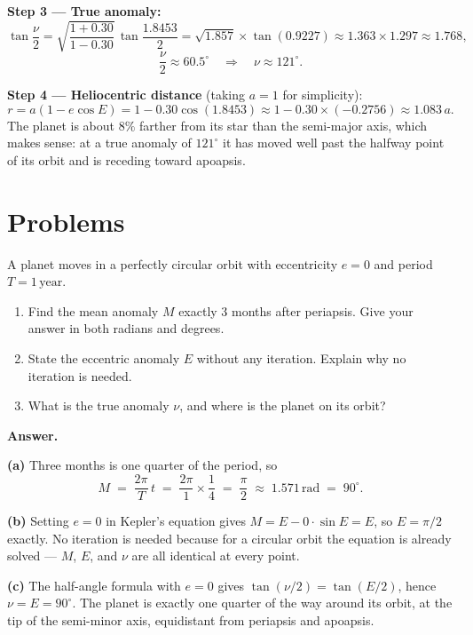\documentclass[12pt]{article}
\newenvironment{probbox}[2]{%
  \begin{tcolorbox}[
    enhanced, breakable,
    colback=blue!5!white, colframe=deepblue,
    boxrule=0.8pt, arc=4pt,
    title={\bfseries [#1] Problem #2}
  ]
}{\end{tcolorbox}}
\begin{document}
\textbf{Step 3 --- True anomaly:}
\[
  \tan\frac{\nu}{2} = \sqrt{\frac{1+0.30}{1-0.30}}\,\tan\frac{1.8453}{2}
                    = \sqrt{1.857} \times \tan(0.9227) \approx 1.363 \times 1.297
                    \approx 1.768,
\]
\[
  \frac{\nu}{2} \approx 60.5^\circ \quad\Rightarrow\quad \nu \approx 121^\circ.
\]

\textbf{Step 4 --- Heliocentric distance} (taking $a = 1$ for simplicity):
\[
  r = a(1 - e\cos E) = 1 - 0.30\cos(1.8453) \approx 1 - 0.30\times(-0.2756)
    \approx 1.083\,a.
\]
The planet is about $8\%$ farther from its star than the semi-major axis, which makes
sense: at a true anomaly of $121^\circ$ it has moved well past the halfway point of
its orbit and is receding toward apoapsis.



\section*{Problems}

\begin{probbox}{5 points}{1. A Simple Circular Check}
A planet moves in a perfectly circular orbit with eccentricity $e = 0$ and period
$T = 1\,\text{year}$.
\begin{enumerate}
  \item[(a)] Find the mean anomaly $M$ exactly 3 months after periapsis.
             Give your answer in both radians and degrees.
  \item[(b)] State the eccentric anomaly $E$ without any iteration.
             Explain why no iteration is needed.
  \item[(c)] What is the true anomaly $\nu$, and where is the planet on its orbit?
\end{enumerate}

\medskip
\textbf{\color{blue!60!black}Answer.}

\textbf{(a)} Three months is one quarter of the period, so
\begin{equation*}
  M \;=\; \frac{2\pi}{T}\,t \;=\; \frac{2\pi}{1}\times\frac{1}{4}
        \;=\; \frac{\pi}{2} \;\approx\; 1.571\,\text{rad} \;=\; 90^\circ.
\end{equation*}

\textbf{(b)} Setting $e = 0$ in Kepler's equation gives $M = E - 0\cdot\sin E = E$,
so $E = \pi/2$ exactly. No iteration is needed because for a circular orbit the
equation is already solved --- $M$, $E$, and $\nu$ are all identical at every point.

\textbf{(c)} The half-angle formula with $e = 0$ gives
$\tan(\nu/2) = \tan(E/2)$, hence $\nu = E = 90^\circ$.
The planet is exactly one quarter of the way around its orbit, at the tip of the
semi-minor axis, equidistant from periapsis and apoapsis.
\end{probbox}
\end{document}
